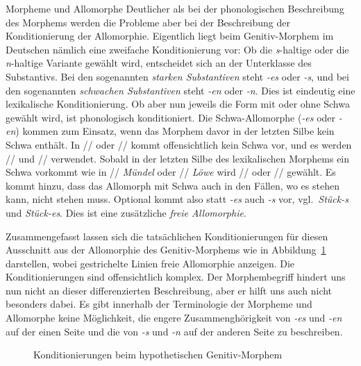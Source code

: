 \begin{Vertiefung}{Morpheme und Allomorphe}
Deutlicher als bei der phonologischen Beschreibung des Morphems werden die Probleme aber bei der Beschreibung der Konditionierung der Allomorphie.
Eigentlich liegt beim Genitiv-Morphem im Deutschen nämlich eine zweifache Konditionierung vor:
Ob die \textit{s}-haltige oder die \textit{n}-haltige Variante gewählt wird, entscheidet sich an der Unterklasse des Substantivs.
Bei den sogenannten \textit{starken Substantiven} steht \textit{-es} oder \textit{-s}, und bei den sogenannten \textit{schwachen Substantiven} steht \textit{-en} oder \textit{-n}.
Dies ist eindeutig eine lexikalische Konditionierung.
Ob aber nun jeweils die Form mit oder ohne Schwa gewählt wird, ist phonologisch konditioniert.
Die Schwa-Allomorphe (\textit{-es} oder \textit{-en}) kommen zum Einsatz, wenn das Morphem davor in der letzten Silbe kein Schwa enthält.
In // oder // kommt offensichtlich kein Schwa vor, und es werden // und // verwendet.
Sobald in der letzten Silbe des lexikalischen Morphems ein Schwa vorkommt wie in // \textit{Mündel} oder // \textit{Löwe} wird // oder // gewählt.
Es kommt hinzu, dass das Allomorph mit Schwa auch in den Fällen, wo es stehen kann, nicht stehen muss.
Optional kommt also statt \textit{-es} auch \textit{-s} vor, vgl.\ \textit{Stück-s} und \textit{Stück-es}.
Dies ist eine zusätzliche \textit{freie Allomorphie}.

Zusammengefasst lassen sich die tatsächlichen Konditionierungen für diesen Ausschnitt aus der Allomorphie des Genitiv-Morphems wie in Abbildung~\ref{fig:kondgensg} darstellen, wobei gestrichelte Linien freie Allomorphie anzeigen.
Die Konditionierungen sind offensichtlich komplex.
Der Morphembegriff hindert uns nun nicht an dieser differenzierten Beschreibung, aber er hilft uns auch nicht besonders dabei.
Es gibt innerhalb der Terminologie der Morpheme und Allomorphe keine Möglichkeit, die engere Zusammenghörigkeit von \textit{-es} und \textit{-en} auf der einen Seite und die von \textit{-s} und \textit{-n} auf der anderen Seite zu beschreiben.

\begin{figure}[!htbp]
  \centering
  \caption{Konditionierungen beim hypothetischen Genitiv-Morphem}
  \label{fig:kondgensg}
\end{figure}


\end{Vertiefung}
